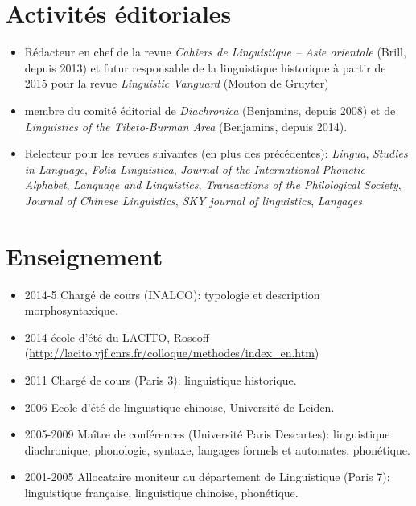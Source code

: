\documentclass[oldfontcommands,oneside,a4paper,11pt]{article}
\begin{document}
 
  
  
 
\section*{Activités éditoriales}
\begin{itemize}
\item Rédacteur en chef de la revue \textit{Cahiers de Linguistique -- Asie orientale} (Brill, depuis 2013) et futur responsable de la linguistique historique à partir de 2015 pour la revue \textit{Linguistic Vanguard} (Mouton de Gruyter)
\item membre du comité éditorial de \textit{Diachronica} (Benjamins, depuis 2008) et de \textit{Linguistics of the Tibeto-Burman Area}  (Benjamins, depuis 2014).
\item Relecteur pour les revues suivantes (en plus des précédentes): \textit{Lingua}, \textit{Studies in Language}, \textit{Folia Linguistica}, \textit{Journal of the International Phonetic Alphabet},  \textit{Language and Linguistics}, \textit{Transactions of the Philological Society}, \textit{Journal of Chinese Linguistics}, \textit{SKY journal of linguistics}, \textit{Langages}
\end{itemize}

\section*{Enseignement}
\begin{itemize}
\item 2014-5 Chargé de cours (INALCO): typologie et description morphosyntaxique.
\item 2014 école d'été du LACITO, Roscoff (\url{http://lacito.vjf.cnrs.fr/colloque/methodes/index\_en.htm})
\item 2011 Chargé de cours (Paris 3): linguistique historique.
\item  2006 Ecole d'été de linguistique chinoise, Université de Leiden.
\item 2005-2009 Maître de conférences (Université Paris Descartes): linguistique diachronique, phonologie, syntaxe, langages formels et automates, phonétique.
\item 2001-2005 Allocataire moniteur au département de Linguistique (Paris 7): linguistique française, linguistique chinoise, phonétique.
\end{itemize}
\end{document}
